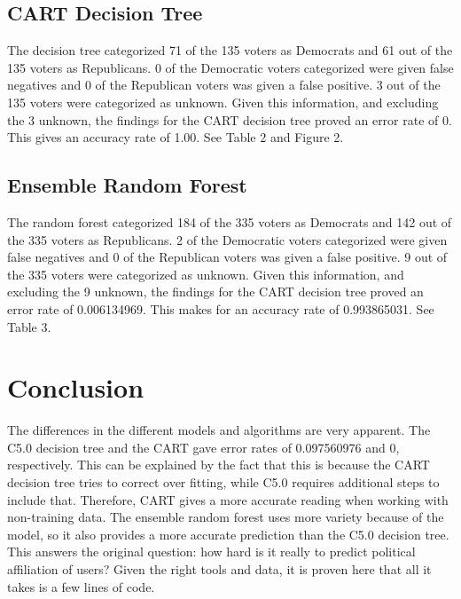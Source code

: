 \documentclass{article}
\begin{document}
\subsection{CART Decision Tree}
The decision tree categorized 71 of the 135 voters as Democrats and 61 out of the 135 voters as Republicans. 0 of the Democratic voters categorized were given false negatives and 0 of the Republican voters was given a false positive. 3 out of the 135 voters were categorized as unknown. Given this information, and excluding the 3 unknown, the findings for the CART decision tree proved an error rate of 0. This gives an accuracy rate of 1.00. See Table 2 and Figure 2.

\subsection{Ensemble Random Forest}
The random forest categorized 184 of the 335 voters as Democrats and 142 out of the 335 voters as Republicans. 2 of the Democratic voters categorized were given false negatives and 0 of the Republican voters was given a false positive. 9 out of the 335 voters were categorized as unknown. Given this information, and excluding the 9 unknown, the findings for the CART decision tree proved an error rate of 0.006134969. This makes for an accuracy rate of 0.993865031. See Table 3.


\section{Conclusion}
The differences in the different models and algorithms are very apparent. The C5.0 decision tree and the CART gave error rates of 0.097560976 and 0, respectively. This can be explained by the fact that this is because the CART decision tree tries to correct over fitting, while C5.0 requires additional steps to include that. Therefore, CART gives a more accurate reading when working with non-training data. The ensemble random forest uses more variety because of the model, so it also provides a more accurate prediction than the C5.0 decision tree. This answers the original question: how hard is it really to predict political affiliation of users? Given the right tools and data, it is proven here that all it takes is a few lines of code.

\pagebreak{}

\printbibliography[
heading=final.bib,
title={Whole bibliography}
]
\pagebreak{}
\end{document}
